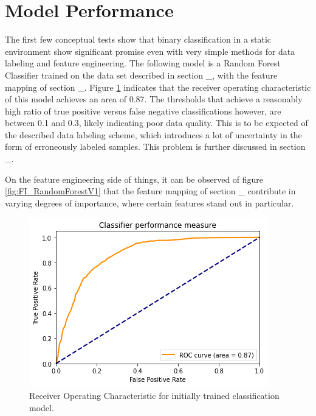 \section{Model Performance} \label{sec:res_ModelPerformance}

The first few conceptual tests show that binary classification in a static environment show significant promise even with very simple methods for data labeling and feature engineering. The following model is a Random Forest Classifier trained on the data set described in section \_, with the feature mapping of section \_. Figure \ref{fig:ROC_RandomForestV1} indicates that the receiver operating characteristic of this model achieves an area of 0.87. The thresholds that achieve a reasonably high ratio of true positive versus false negative classifications however, are between 0.1 and 0.3, likely indicating poor data quality. This is to be expected of the described data labeling scheme, which introduces a lot of uncertainty in the form of erroneously labeled samples. This problem is further discussed in section \_.

On the feature engineering side of things, it can be observed of figure \ref{fig:FI_RandomForestV1} that the feature mapping of section \_ contribute in varying degrees of importance, where certain features stand out in particular. 

\begin{figure}[h]
    \centering
    \includegraphics[width=\textwidth]{Images/Models/ROC_RandomForestV1.png}
    \caption{Receiver Operating Characteristic for initially trained classification model.}
    \label{fig:ROC_RandomForestV1}
\end{figure}

